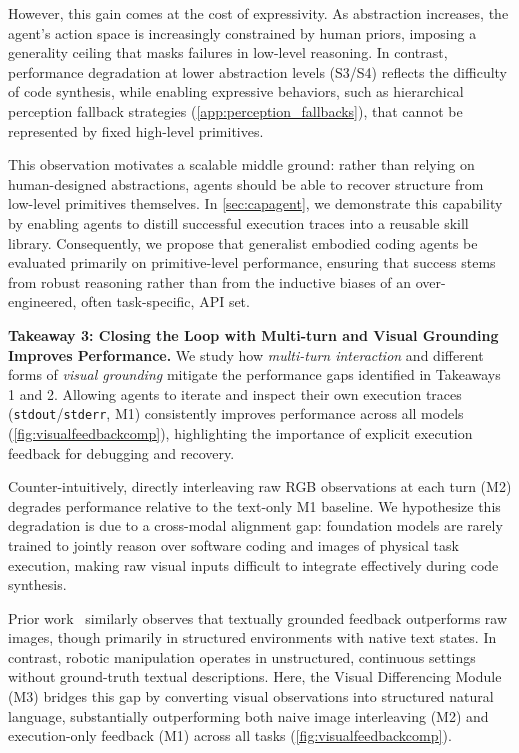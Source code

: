 However, this gain comes at the cost of expressivity. As abstraction increases, the agent’s action space is increasingly constrained by human priors, imposing a generality ceiling that masks failures in low-level reasoning. In contrast, performance degradation at lower abstraction levels (S3/S4) reflects the difficulty of code synthesis, while enabling expressive behaviors, such as hierarchical perception fallback strategies (\cref{app:perception_fallbacks}), that cannot be represented by fixed high-level primitives. 

This observation motivates a scalable middle ground: rather than relying on human-designed abstractions, agents should be able to recover structure from low-level primitives themselves. In \cref{sec:capagent}, we demonstrate this capability by enabling agents to distill successful execution traces into a reusable skill library. Consequently, we propose that generalist embodied coding agents be evaluated primarily on primitive-level performance, ensuring that success stems from robust reasoning rather than from the inductive biases of an over-engineered, often task-specific, API set.






\textbf{Takeaway 3: Closing the Loop with Multi-turn and Visual Grounding Improves Performance.} We study how \textit{multi-turn interaction} and different forms of \textit{visual grounding} mitigate the performance gaps identified in Takeaways 1 and 2.
Allowing agents to iterate and inspect their own execution traces (\texttt{stdout}/\texttt{stderr}, M1) consistently improves performance across all models (\cref{fig:visualfeedbackcomp}), highlighting the importance of explicit execution feedback for debugging and recovery.

Counter-intuitively, directly interleaving raw RGB observations at each turn (M2) degrades performance relative to the text-only M1 baseline. We hypothesize this degradation is due to a cross-modal alignment gap: foundation models are rarely trained to jointly reason over software coding and images of physical task execution, making raw visual inputs difficult to integrate effectively during code synthesis.

Prior work~\cite{hu2025lmgame, wang2026visgym} similarly observes that textually grounded feedback outperforms raw images, though primarily in structured environments with native text states. In contrast, robotic manipulation operates in unstructured, continuous settings without ground-truth textual descriptions. Here, the Visual Differencing Module (M3) bridges this gap by converting visual observations into structured natural language, substantially outperforming both naive image interleaving (M2) and execution-only feedback (M1) across all tasks (\cref{fig:visualfeedbackcomp}).

